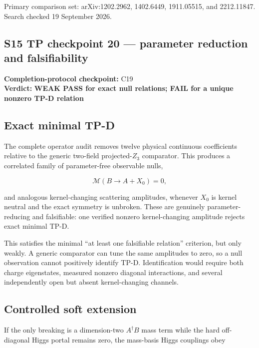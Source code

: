 \documentclass[
]{article}
\begin{document}
Primary comparison set: arXiv:1202.2962, 1402.6449, 1911.05515, and
2212.11847. Search checked 19 September 2026.

\newpage

\hypertarget{s15-tp-checkpoint-20-parameter-reduction-and-falsifiability}{%
\subsection{S15 TP checkpoint 20 --- parameter reduction and
falsifiability}\label{s15-tp-checkpoint-20-parameter-reduction-and-falsifiability}}

\textbf{Completion-protocol checkpoint:} C19\\
\textbf{Verdict:} \textbf{WEAK PASS for exact null relations; FAIL for a
unique nonzero TP-D relation}

\hypertarget{exact-minimal-tp-d}{%
\subsection{Exact minimal TP-D}\label{exact-minimal-tp-d}}

The complete operator audit removes twelve physical continuous
coefficients relative to the generic two-field projected-\(Z_3\)
comparator. This produces a correlated family of parameter-free
observable nulls,

\[
\mathcal M(B\to A+X_0)=0,
\]

and analogous kernel-changing scattering amplitudes, whenever \(X_0\) is
kernel neutral and the exact symmetry is unbroken. These are genuinely
parameter-reducing and falsifiable: one verified nonzero kernel-changing
amplitude rejects exact minimal TP-D.

This satisfies the minimal ``at least one falsifiable relation''
criterion, but only weakly. A generic comparator can tune the same
amplitudes to zero, so a null observation cannot positively identify
TP-D. Identification would require both charge eigenstates, measured
nonzero diagonal interactions, and several independently open but absent
kernel-changing channels.

\hypertarget{controlled-soft-extension}{%
\subsection{Controlled soft extension}\label{controlled-soft-extension}}

If the only breaking is a dimension-two \(A^\dagger B\) mass term while
the hard off-diagonal Higgs portal remains zero, the mass-basis Higgs
couplings obey
\end{document}
